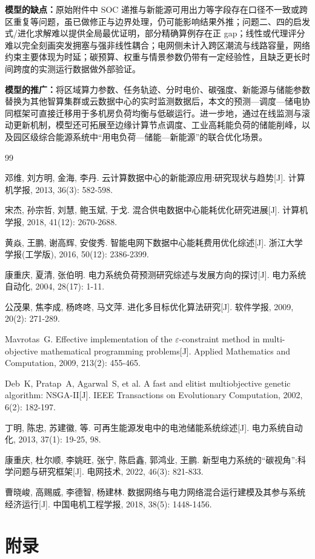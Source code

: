 \documentclass[UTF8,a4paper,zihao=-4]{ctexart}
\begin{document}
\textbf{\qquad 模型的缺点：}原始附件中 SOC 递推与新能源可用出力等字段存在口径不一致或跨区重复等问题，虽已做修正与边界处理，仍可能影响结果外推；问题二、四的启发式/进化求解难以提供全局最优证明，部分精确算例存在正 gap；线性或代理评分难以完全刻画突发拥塞与强非线性耦合；电网侧未计入跨区潮流与线路容量，网络约束主要体现为时延；碳预算、权重与情景参数仍带有一定经验性，且缺乏更长时间跨度的实测运行数据做外部验证。

\textbf{\qquad 模型的推广：}将区域算力参数、任务轨迹、分时电价、碳强度、新能源与储能参数替换为其他智算集群或云数据中心的实时监测数据后，本文的预测—调度—储电协同框架可直接迁移用于多机房负荷均衡与低碳运行。进一步地，通过在线监测与滚动更新机制，模型还可拓展至边缘计算节点调度、工业高耗能负荷的储能削峰，以及园区级综合能源系统中“用电负荷—储能—新能源”的联合优化场景。
\newpage
{}


\vspace{1em}


\begin{thebibliography}{99}

邓维, 刘方明, 金海, 李丹. 云计算数据中心的新能源应用:研究现状与趋势[J]. 计算机学报, 2013, 36(3): 582-598.

宋杰, 孙宗哲, 刘慧, 鲍玉斌, 于戈. 混合供电数据中心能耗优化研究进展[J]. 计算机学报, 2018, 41(12): 2670-2688.

黄焱, 王鹏, 谢高辉, 安俊秀. 智能电网下数据中心能耗费用优化综述[J]. 浙江大学学报(工学版), 2016, 50(12): 2386-2399.

康重庆, 夏清, 张伯明. 电力系统负荷预测研究综述与发展方向的探讨[J]. 电力系统自动化, 2004, 28(17): 1-11.

公茂果, 焦李成, 杨咚咚, 马文萍. 进化多目标优化算法研究[J]. 软件学报, 2009, 20(2): 271-289.

Mavrotas~G. Effective implementation of the $\varepsilon$-constraint method in multi-objective mathematical programming problems[J]. Applied Mathematics and Computation, 2009, 213(2): 455-465.

Deb~K, Pratap~A, Agarwal~S, et al. A fast and elitist multiobjective genetic algorithm: NSGA-II[J]. IEEE Transactions on Evolutionary Computation, 2002, 6(2): 182-197.

丁明, 陈忠, 苏建徽, 等. 可再生能源发电中的电池储能系统综述[J]. 电力系统自动化, 2013, 37(1): 19-25, 98.

康重庆, 杜尔顺, 李姚旺, 张宁, 陈启鑫, 郭鸿业, 王鹏. 新型电力系统的“碳视角”:科学问题与研究框架[J]. 电网技术, 2022, 46(3): 821-833.

曹晓峻, 高赐威, 李德智, 杨建林. 数据网络与电力网络混合运行建模及其参与系统经济运行[J]. 中国电机工程学报, 2018, 38(5): 1448-1456.

\end{thebibliography}


\newpage
{}




\section{附录}
\end{document}
